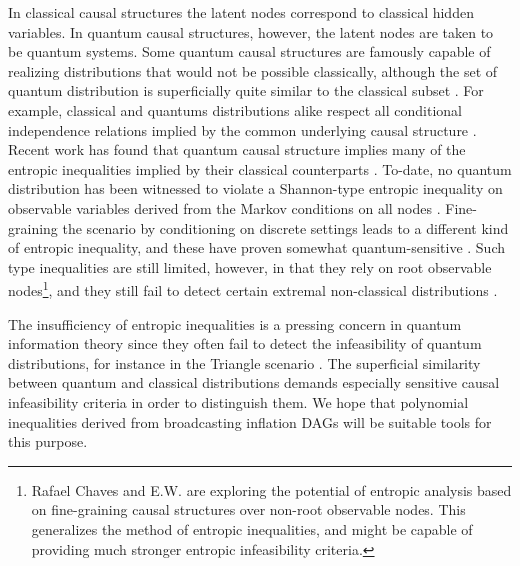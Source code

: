 
In classical causal structures the latent nodes correspond to classical hidden variables. In quantum causal structures, however, the latent nodes are taken to be quantum systems. Some quantum causal structures are famously capable of realizing distributions that would not be possible classically, although the set of quantum distribution is superficially quite similar to the classical subset \cite{pusey2014gdag,fritz2012bell}. For example, classical and quantums distributions alike respect all conditional independence relations implied by the common underlying causal structure \cite{pusey2014gdag}. Recent work has found that quantum causal structure implies many of the entropic inequalities implied by their classical counterparts \cite{pusey2014gdag,Chaves2015infoquantum,ChavesNoSignalling}. To-date, no quantum distribution has been witnessed to violate a Shannon-type entropic inequality on observable variables derived from the Markov conditions on all nodes \cite{chaves2012entropic,fritz2012bell}. Fine-graining the scenario by conditioning on discrete settings leads to a different kind of entropic inequality, and these have proven somewhat quantum-sensitive \cite{braunstein1988entropic,SchumacherInequality,chaves2014novel}. Such \citet{braunstein1988entropic} type inequalities are still limited, however, in that they rely on root observable nodes\footnote{Rafael Chaves and E.W. are exploring the potential of entropic analysis based on fine-graining causal structures over non-root observable nodes. This generalizes the method of entropic inequalities, and might be capable of providing much stronger entropic infeasibility criteria.}, and they still fail to detect certain extremal non-classical distributions \cite{chaves2014novel,fritz2012bell}.  

The insufficiency of entropic inequalities is a pressing concern in quantum information theory since they often fail to detect the infeasibility of quantum distributions, for instance in the Triangle scenario \citep[Prob. 2.17]{fritz2012bell}. The superficial similarity between quantum and classical distributions demands especially sensitive causal infeasibility criteria in order to distinguish them. We hope that polynomial inequalities derived from broadcasting inflation DAGs will be suitable tools for this purpose.


